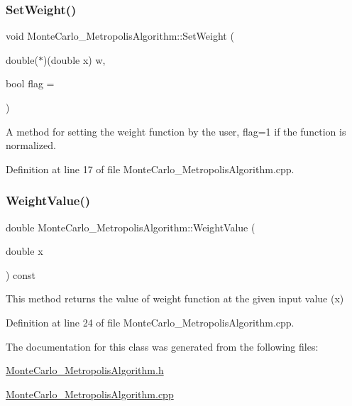 \mbox{\label{class_monte_carlo___metropolis_algorithm_ac19d55a838561eaecea3ea519de7e091}} 
\subsubsection{\texorpdfstring{Set\+Weight()}{SetWeight()}}
{\footnotesize\ttfamily void Monte\+Carlo\+\_\+\+Metropolis\+Algorithm\+::\+Set\+Weight (\begin{DoxyParamCaption}\item[{double($\ast$)(double x)}]{w,  }\item[{bool}]{flag = {} }\end{DoxyParamCaption})}



A method for setting the weight function by the user, flag=1 if the function is normalized. 



Definition at line 17 of file Monte\+Carlo\+\_\+\+Metropolis\+Algorithm.\+cpp.

\mbox{\label{class_monte_carlo___metropolis_algorithm_a5295f6e5691292d833da48105b13ece4}} 
\subsubsection{\texorpdfstring{Weight\+Value()}{WeightValue()}}
{\footnotesize\ttfamily double Monte\+Carlo\+\_\+\+Metropolis\+Algorithm\+::\+Weight\+Value (\begin{DoxyParamCaption}\item[{double}]{x }\end{DoxyParamCaption}) const}



This method returns the value of weight function at the given input value (x) 



Definition at line 24 of file Monte\+Carlo\+\_\+\+Metropolis\+Algorithm.\+cpp.



The documentation for this class was generated from the following files\+:\begin{DoxyCompactItemize}
\item 
\hyperlink{_monte_carlo___metropolis_algorithm_8h}{Monte\+Carlo\+\_\+\+Metropolis\+Algorithm.\+h}\item 
\hyperlink{_monte_carlo___metropolis_algorithm_8cpp}{Monte\+Carlo\+\_\+\+Metropolis\+Algorithm.\+cpp}\end{DoxyCompactItemize}
